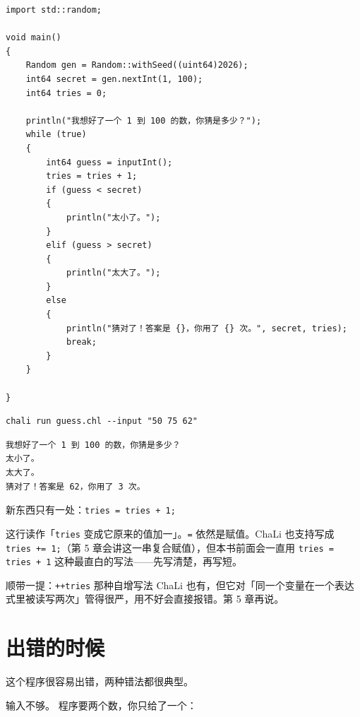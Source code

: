 \par
\medskip
\begin{lstlisting}[style=chali]
import std::random;

void main()
{
    Random gen = Random::withSeed((uint64)2026);
    int64 secret = gen.nextInt(1, 100);
    int64 tries = 0;

    println("我想好了一个 1 到 100 的数，你猜是多少？");
    while (true)
    {
        int64 guess = inputInt();
        tries = tries + 1;
        if (guess < secret)
        {
            println("太小了。");
        }
        elif (guess > secret)
        {
            println("太大了。");
        }
        else
        {
            println("猜对了！答案是 {}，你用了 {} 次。", secret, tries);
            break;
        }
    }

}
\end{lstlisting}
\par
\medskip

\par
\medskip
\begin{lstlisting}[style=sh]
chali run guess.chl --input "50 75 62"
\end{lstlisting}
\par
\medskip

\par
\medskip
\begin{lstlisting}[style=out]
我想好了一个 1 到 100 的数，你猜是多少？
太小了。
太大了。
猜对了！答案是 62，你用了 3 次。
\end{lstlisting}
\par
\medskip

新东西只有一处：\texttt{tries =\allowbreak{} tries + 1;}

这行读作「\texttt{tries} 变成它原来的值加一」。\texttt{=\allowbreak{}} 依然是赋值。ChaLi 也支持写成 \texttt{tries +=\allowbreak{} 1;}（第 5 章会讲这一串复合赋值），但本书前面会一直用 \texttt{tries =\allowbreak{} tries + 1} 这种最直白的写法——先写清楚，再写短。

顺带一提：\texttt{++tries} 那种自增写法 ChaLi 也有，但它对「同一个变量在一个表达式里被读写两次」管得很严，用不好会直接报错。第 5 章再说。

\section{出错的时候}

这个程序很容易出错，两种错法都很典型。

输入不够。 程序要两个数，你只给了一个：

